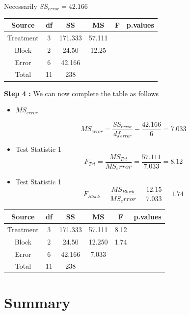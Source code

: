 \documentclass[]{article}
\begin{document}
Necessarily $SS_{error} = 42.166$

{
\Large
\begin{center}
\begin{tabular}{|c|c|c|c|c|c|}
\hline Source	       &	df	&	SS	&	MS	&	F	&	p.values	\\ \hline
Treatment      &	3	&	171.333	&	57.111	&		&		\\ \hline
Block	&	2	&	24.50	&	12.25	&		&		\\ \hline
Error	&	6	&	42.166	&		\phantom{spa}		&	\phantom{spa}	&		\\ \hline 
Total	&	11	&	238	&		&		&		\\ \hline 
\end{tabular}
\end{center}
}

\newpage


\noindent \textbf{Step 4 :} We can now complete the table as follows
\begin{itemize}
	\item $MS_{error}$
	
	\[ MS_{error} = \frac{SS_{error}}{df_{error}} - \frac{42.166}{6} = 7.033\]
	
	\item Test Statistic 1
	\[F_{Trt} = \frac{MS_{Trt}}{ MS_error } = \frac{57.111}{7.033} = 8.12 \]
	
	\item Test Statistic 1
	\[F_{Block} = \frac{MS_{Block}}{ MS_error } = \frac{12.15}{7.033} = 1.74 \]
\end{itemize}

{
	\Large
	\begin{center}
		\begin{tabular}{|c|c|c|c|c|c|}
\hline Source	       &	df	&	SS	&	MS	&	F	&	p.values	\\ \hline
Treatment      &	3	&	171.333	&	57.111	&	8.12	&		\\ \hline
Block	&	2	&	24.50	&	12.250	&	1.74	&		\\ \hline
Error	&	6	&	42.166	&	7.033	&		&		\\ \hline 
Total	&	11	&	238	&		&\phantom{spa}		&	\phantom{spa}		\\ \hline 
\end{tabular}
\end{center}
}


\newpage
\section{Summary}
\end{document}
